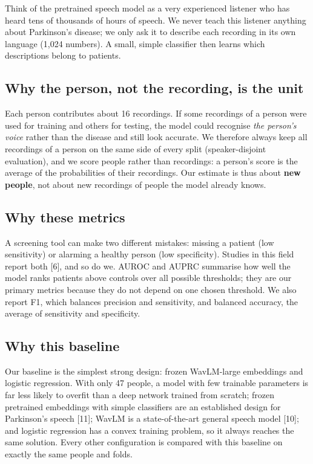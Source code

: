 \documentclass[11pt,a4paper]{article}
\begin{document}
\begin{tcolorbox}[colback=green!3,colframe=green!40!black,boxrule=0.5pt,arc=2pt,left=5pt,right=5pt,top=3pt,bottom=3pt,title={\small\bfseries In plain words}]\small Think of the pretrained speech model as a very experienced listener who has heard tens of thousands of hours of speech. We never teach this listener anything about Parkinson's disease; we only ask it to describe each recording in its own language (1,024 numbers). A small, simple classifier then learns which descriptions belong to patients.\end{tcolorbox}
\subsection{Why the person, not the recording, is the unit}
Each person contributes about 16 recordings. If some recordings of a person were used for training and others for testing, the model could recognise \emph{the person's voice} rather than the disease and still look accurate. We therefore always keep all recordings of a person on the same side of every split (speaker-disjoint evaluation), and we score people rather than recordings: a person's score is the average of the probabilities of their recordings. Our estimate is thus about \textbf{new people}, not about new recordings of people the model already knows.

\subsection{Why these metrics}
A screening tool can make two different mistakes: missing a patient (low sensitivity) or alarming a healthy person (low specificity). Studies in this field report both [6], and so do we. AUROC and AUPRC summarise how well the model ranks patients above controls over all possible thresholds; they are our primary metrics because they do not depend on one chosen threshold. We also report F1, which balances precision and sensitivity, and balanced accuracy, the average of sensitivity and specificity.

\subsection{Why this baseline}
Our baseline is the simplest strong design: frozen WavLM-large embeddings and logistic regression. With only 47 people, a model with few trainable parameters is far less likely to overfit than a deep network trained from scratch; frozen pretrained embeddings with simple classifiers are an established design for Parkinson's speech [11]; WavLM is a state-of-the-art general speech model [10]; and logistic regression has a convex training problem, so it always reaches the same solution. Every other configuration is compared with this baseline on exactly the same people and folds.
\end{document}
